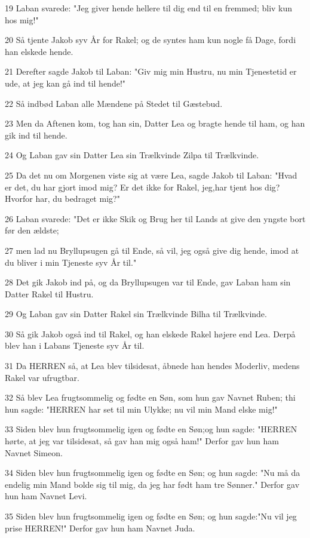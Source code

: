 \par 19 Laban svarede: "Jeg giver hende hellere til dig end til en fremmed; bliv kun hos mig!"
\par 20 Så tjente Jakob syv År for Rakel; og de syntes ham kun nogle få Dage, fordi han elskede hende.
\par 21 Derefter sagde Jakob til Laban: "Giv mig min Hustru, nu min Tjenestetid er ude, at jeg kan gå ind til hende!"
\par 22 Så indbød Laban alle Mændene på Stedet til Gæstebud.
\par 23 Men da Aftenen kom, tog han sin, Datter Lea og bragte hende til ham, og han gik ind til hende.
\par 24 Og Laban gav sin Datter Lea sin Trælkvinde Zilpa til Trælkvinde.
\par 25 Da det nu om Morgenen viste sig at være Lea, sagde Jakob til Laban: "Hvad er det, du har gjort imod mig? Er det ikke for Rakel, jeg,har tjent hos dig? Hvorfor har, du bedraget mig?"
\par 26 Laban svarede: "Det er ikke Skik og Brug her til Lands at give den yngste bort før den ældste;
\par 27 men lad nu Bryllupsugen gå til Ende, så vil, jeg også give dig hende, imod at du bliver i min Tjeneste syv År til."
\par 28 Det gik Jakob ind på, og da Bryllupsugen var til Ende, gav Laban ham sin Datter Rakel til Hustru.
\par 29 Og Laban gav sin Datter Rakel sin Trælkvinde Bilha til Trælkvinde.
\par 30 Så gik Jakob også ind til Rakel, og han elskede Rakel højere end Lea. Derpå blev han i Labans Tjeneste syv År til.
\par 31 Da HERREN så, at Lea blev tilsidesat, åbnede han hendes Moderliv, medens Rakel var ufrugtbar.
\par 32 Så blev Lea frugtsommelig og fødte en Søn, som hun gav Navnet Ruben; thi hun sagde: "HERREN har set til min Ulykke; nu vil min Mand elske mig!"
\par 33 Siden blev hun frugtsommelig igen og fødte en Søn;og hun sagde: "HERREN hørte, at jeg var tilsidesat, så gav han mig også ham!" Derfor gav hun ham Navnet Simeon.
\par 34 Siden blev hun frugtsommelig igen og fødte en Søn; og hun sagde: "Nu må da endelig min Mand bolde sig til mig, da jeg har født ham tre Sønner." Derfor gav hun ham Navnet Levi.
\par 35 Siden blev hun frugtsommelig igen og fødte en Søn; og hun sagde:"Nu vil jeg prise HERREN!" Derfor gav hun ham Navnet Juda.

